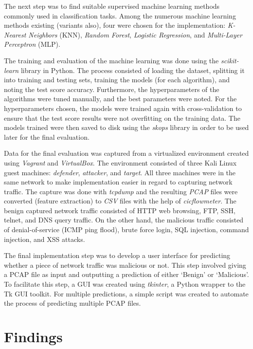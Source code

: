 \documentclass[12pt, a4paper]{article}
\begin{document}
    The next step was to find suitable supervised machine learning methods commonly used in classification tasks.
    Among the numerous machine learning methods existing (variants also), four were chosen for the implementation: \textit{K-Nearest Neighbors} (KNN), \textit{Random Forest}, \textit{Logistic Regression}, and \textit{Multi-Layer Perceptron} (MLP).

    The training and evaluation of the machine learning was done using the \textit{scikit-learn} library in Python.
    The process consisted of loading the dataset, splitting it into training and testing sets, training the models (for each algorithm), and noting the test score accuracy.
    Furthermore, the hyperparameters of the algorithms were tuned manually, and the best parameters were noted.
    For the hyperparameters chosen, the models were trained again with cross-validation to ensure that the test score results were not overfitting on the training data.
    The models trained were then saved to disk using the \textit{skops} library in order to be used later for the final evaluation.


    Data for the final evaluation was captured from a virtualized environment created using \textit{Vagrant} and \textit{VirtualBox}.
    The environment consisted of three Kali Linux guest machines: \textit{defender}, \textit{attacker}, and \textit{target}.
    All three machines were in the same network to make implementation easier in regard to capturing network traffic.
    The capture was done with \textit{tcpdump} and the resulting \textit{PCAP} files were converted (feature extraction) to \textit{CSV} files with the help of \textit{cicflowmeter}.
    The benign captured network traffic consisted of HTTP web browsing, FTP, SSH, telnet, and DNS query traffic.
    On the other hand, the malicious traffic consisted of denial-of-service (ICMP ping flood), brute force login, SQL injection, command injection, and XSS attacks.

    The final implementation step was to develop a user interface for predicting whether a piece of network traffic was malicious or not.
    This step involved giving a PCAP file as input and outputting a prediction of either `Benign' or `Malicious'.
    To facilitate this step, a GUI was created using \textit{tkinter}, a Python wrapper to the Tk GUI toolkit.
    For multiple predictions, a simple script was created to automate the process of predicting multiple PCAP files.


    \section{Findings}\label{sec:findings}
\end{document}
